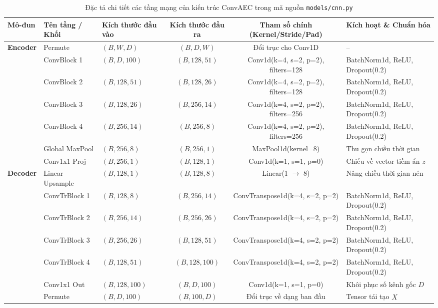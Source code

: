 \documentclass[sigconf,nonacm]{acmart}
\begin{document}
\begin{table}[t]
\centering
\caption{Đặc tả chi tiết các tầng mạng của kiến trúc ConvAEC trong mã nguồn \texttt{models/cnn.py}}
\label{tab:convaec_architecture}
\footnotesize
\begin{tabularx}{\textwidth}{lllccl}
\toprule
\textbf{Mô-đun} & \textbf{Tên tầng / Khối} & \textbf{Kích thước đầu vào} & \textbf{Kích thước đầu ra} & \textbf{Tham số chính (Kernel/Stride/Pad)} & \textbf{Kích hoạt \& Chuẩn hóa} \\
\midrule
\multirow{6}{*}{\textbf{Encoder}} 
& Permute & $(B, W, D)$ & $(B, D, W)$ & Đổi trục cho Conv1D & -- \\
& ConvBlock 1 & $(B, D, 100)$ & $(B, 128, 51)$ & Conv1d(k=4, s=2, p=2), filters=128 & BatchNorm1d, ReLU, Dropout(0.2) \\
& ConvBlock 2 & $(B, 128, 51)$ & $(B, 128, 26)$ & Conv1d(k=4, s=2, p=2), filters=128 & BatchNorm1d, ReLU, Dropout(0.2) \\
& ConvBlock 3 & $(B, 128, 26)$ & $(B, 256, 14)$ & Conv1d(k=4, s=2, p=2), filters=256 & BatchNorm1d, ReLU, Dropout(0.2) \\
& ConvBlock 4 & $(B, 256, 14)$ & $(B, 256, 8)$ & Conv1d(k=4, s=2, p=2), filters=256 & BatchNorm1d, ReLU, Dropout(0.2) \\
& Global MaxPool & $(B, 256, 8)$ & $(B, 256, 1)$ & MaxPool1d(kernel=8) & Thu gọn chiều thời gian \\
& Conv1x1 Proj & $(B, 256, 1)$ & $(B, 128, 1)$ & Conv1d(k=1, s=1, p=0) & Chiếu về vector tiềm ẩn $z$ \\
\midrule
\multirow{6}{*}{\textbf{Decoder}} 
& Linear Upsample & $(B, 128, 1)$ & $(B, 128, 8)$ & Linear(1 $\rightarrow$ 8) & Nâng chiều thời gian nén \\
& ConvTrBlock 1 & $(B, 128, 8)$ & $(B, 256, 14)$ & ConvTranspose1d(k=4, s=2, p=2) & BatchNorm1d, ReLU, Dropout(0.2) \\
& ConvTrBlock 2 & $(B, 256, 14)$ & $(B, 256, 26)$ & ConvTranspose1d(k=4, s=2, p=2) & BatchNorm1d, ReLU, Dropout(0.2) \\
& ConvTrBlock 3 & $(B, 256, 26)$ & $(B, 128, 51)$ & ConvTranspose1d(k=4, s=2, p=2) & BatchNorm1d, ReLU, Dropout(0.2) \\
& ConvTrBlock 4 & $(B, 128, 51)$ & $(B, 128, 100)$ & ConvTranspose1d(k=4, s=2, p=2) & BatchNorm1d, ReLU, Dropout(0.2) \\
& Conv1x1 Out & $(B, 128, 100)$ & $(B, D, 100)$ & Conv1d(k=1, s=1, p=0) & Khôi phục số kênh gốc $D$ \\
& Permute & $(B, D, 100)$ & $(B, 100, D)$ & Đổi trục về dạng ban đầu & Tensor tái tạo $\hat{X}$ \\

\end{tabularx}
\end{table}
\end{document}
